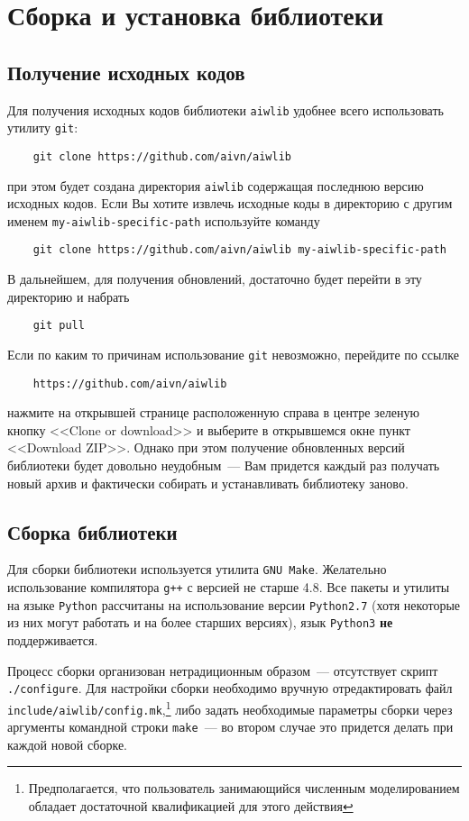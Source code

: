 \section{Сборка и установка библиотеки}
\subsection{Получение исходных кодов}
Для получения исходных кодов библиотеки \verb'aiwlib' удобнее всего
использовать утилиту \verb'git':
\begin{verbatim}
    git clone https://github.com/aivn/aiwlib
\end{verbatim}
при этом будет создана директория \verb'aiwlib' содержащая последнюю
версию исходных кодов. Если Вы хотите извлечь исходные коды в директорию с
другим именем \verb'my-aiwlib-specific-path' используйте команду
\begin{verbatim}
    git clone https://github.com/aivn/aiwlib my-aiwlib-specific-path
\end{verbatim}

В дальнейшем, для получения обновлений,
достаточно будет перейти в эту директорию и набрать
\begin{verbatim}
    git pull
\end{verbatim}

Если по каким то причинам использование \verb'git' невозможно,
перейдите по ссылке
\begin{verbatim}
    https://github.com/aivn/aiwlib
\end{verbatim}
нажмите на открывшей странице расположенную справа в центре зеленую
кнопку <<Clone or download>> и выберите в открывшемся окне пункт
<<Download ZIP>>. Однако при этом получение обновленных версий
библиотеки будет довольно неудобным~--- Вам придется каждый раз
получать новый архив и фактически собирать и устанавливать библиотеку заново. 

\subsection{Сборка библиотеки}
Для сборки библиотеки используется утилита \verb'GNU Make'.
Желательно использование компилятора \verb'g++' с версией не старше 4.8. 
Все пакеты и утилиты на языке \verb'Python' рассчитаны на
использование версии \verb'Python2.7' (хотя некоторые из них могут
работать и на более старших версиях), язык \verb'Python3' {\bf не} поддерживается. 

Процесс сборки организован нетрадиционным образом~---
отсутствует скрипт \verb'./configure'. Для настройки сборки необходимо
вручную отредактировать файл
\verb'include/aiwlib/config.mk',\footnote{
Предполагается, что пользователь занимающийся численным моделированием
обладает достаточной квалификацией для этого действия}
либо задать необходимые параметры сборки через аргументы командной
строки \verb'make'~--- во втором случае это придется делать при
каждой новой сборке.


